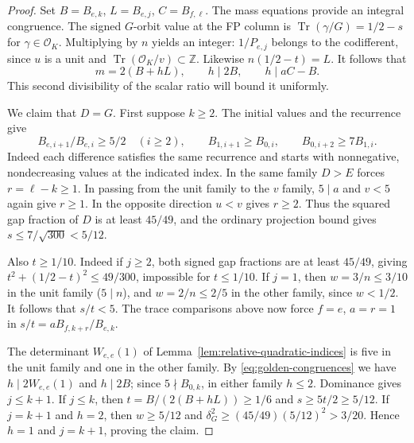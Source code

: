 \documentclass[11pt,reqno]{amsart}
\theoremstyle{remark}\newtheorem{remark}[theorem]{Remark}
\numberwithin{equation}{section}
\begin{document}
\begin{proof}
Set $B=B_{e,k}$, $L=B_{e,j}$, $C=B_{f,\ell}$. The mass equations
provide an integral congruence. The signed $G$-orbit value at
the FP column is $\operatorname{Tr}(\gamma/G)=1/2-s$ for
$\gamma\in\mathcal O_K$. Multiplying by $n$ yields an integer:
$1/P_{e,j}$ belongs to the codifferent, since $u$ is a unit and
$\operatorname{Tr}(\mathcal O_K/v)\subset\mathbb Z$. Likewise
$n(1/2-t)=L$. It follows that
\begin{equation}\label{eq:golden-congruences}
 m=2(B+hL),\qquad h\mid2B,\qquad h\mid aC-B.
\end{equation}
This second divisibility of the scalar ratio will bound it uniformly.

We claim that $D=G$. First suppose $k\ge2$. The initial values
and the recurrence give
\[
 B_{e,i+1}/B_{e,i}\ge5/2\quad(i\ge2),\qquad
 B_{1,i+1}\ge B_{0,i},\qquad B_{0,i+2}\ge7B_{1,i}.
\]
Indeed each difference satisfies the same recurrence and starts
with nonnegative, nondecreasing values at the indicated index.
In the same family $D>E$ forces $r=\ell-k\ge1$. In passing from
the unit family to the $v$ family, $5\mid a$ and $v<5$ again give
$r\ge1$. In the opposite direction $u<v$ gives $r\ge2$.
Thus the squared gap fraction of $D$ is at least $45/49$, and
the ordinary projection bound gives $s\le7/\sqrt{300}<5/12$.

Also $t\ge1/10$. Indeed if $j\ge2$, both signed gap fractions
are at least $45/49$, giving
$t^2+(1/2-t)^2\le49/300$, impossible for $t\le1/10$.
If $j=1$, then $w=3/n\le3/10$ in the unit family ($5\mid n$),
and $w=2/n\le2/5$ in the other family, since $w<1/2$.
It follows that $s/t<5$. The trace comparisons above now force
$f=e$, $a=r=1$ in $s/t=aB_{f,k+r}/B_{e,k}$.

The determinant $W_{e,e}(1)$ of
Lemma~\ref{lem:relative-quadratic-indices} is five in the unit
family and one in the other family. By \eqref{eq:golden-congruences}
we have $h\mid2W_{e,e}(1)$ and $h\mid2B$; since
$5\nmid B_{0,k}$, in either family $h\le2$.
Dominance gives $j\le k+1$. If $j\le k$, then
$t=B/(2(B+hL))\ge1/6$ and $s\ge5t/2\ge5/12$.
If $j=k+1$ and $h=2$, then $w\ge5/12$ and
$\delta_G^2\ge(45/49)(5/12)^2>3/20$.
Hence $h=1$ and $j=k+1$, proving the claim.


\end{proof}
\end{document}
